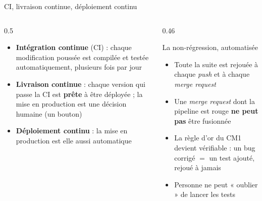 \documentclass[aspectratio=169,10pt]{beamer}
\begin{document}
\begin{frame}{CI, livraison continue, déploiement continu}
  \begin{columns}[T]
    \begin{column}{0.5\textwidth}
      \begin{itemize}
        \item \textbf{Intégration continue} (CI) : chaque modification poussée est compilée et testée automatiquement, plusieurs fois par jour
        \item \textbf{Livraison continue} : chaque version qui passe la CI est \textbf{prête} à être déployée ; la mise en production est une décision humaine (un bouton)
        \item \textbf{Déploiement continu} : la mise en production est elle aussi automatique
      \end{itemize}
    \end{column}
    \begin{column}{0.46\textwidth}
      \begin{block}{La non-régression, automatisée}
        \begin{itemize}
          \item Toute la suite est rejouée à chaque \textit{push} et à chaque \textit{merge request}
          \item Une \textit{merge request} dont la pipeline est rouge \textbf{ne peut pas} être fusionnée
          \item La règle d'or du CM1 devient vérifiable : un bug corrigé $=$ un test ajouté, rejoué à jamais
          \item Personne ne peut « oublier » de lancer les tests
        \end{itemize}
      \end{block}
    \end{column}
  \end{columns}
\end{frame}
\end{document}
